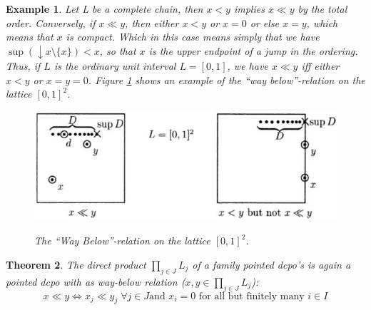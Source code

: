 \documentclass[a4paper,12pt]{article}
\newtheorem{theorem}{Theorem}[section]
\newtheorem{example}[theorem]{Example}
\begin{document}
\begin{example}\label{gewonelijn}
Let L be a \emph{complete chain}, then $x < y$ implies $x \ll y$ by the total order. Conversely, if $x \ll y$, then either $x < y$ or $x = 0$ or else $x = y$, which means that $x$ is compact. Which in this case means simply that we have $\sup(\downarrow x\setminus \{x\}) < x$, so that $x$ is the upper endpoint of a jump in the ordering. Thus, if $L$ is the ordinary unit interval $L = [0,1]$, we have $x \ll y$ iff either $x < y$ or $x = y = 0$. Figure \ref{figuurway} shows an example of the ``way below''-relation on the lattice $[0,1]^2$.
\begin{figure}
  \centering
  \includegraphics[scale=0.7]{figuurway.jpg}\\
  \caption{The ``Way Below''-relation on the lattice $[0,1]^2$.}\label{figuurway}
\end{figure}

\end{example}




\begin{theorem}
The direct product $\prod_{j \in J}L_j$ of a family pointed dcpo's is again a pointed dcpo with as way-below relation ($x, y \in \prod_{j \in J}L_j$):
$$x \ll y \Leftrightarrow x_j \ll y_j \;\forall j \in J \text{and } x_i = 0 \text{ for all but finitely many } i \in I$$
\end{theorem}
\end{document}
